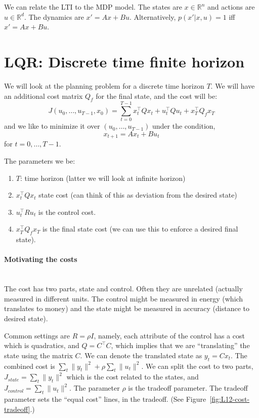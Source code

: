 We can relate the LTI to the MDP model. The states are $x\in
\mathbb{R}^n$ and actions are $u\in\mathbb{R}^d$. The dynamics are
$x'=Ax+Bu$. Alternatively, $p(x'|x,u)=1 $ iff $x'=Ax+Bu$.

\section{LQR: Discrete time finite horizon}

We will look at the planning problem for a discrete time horizon
$T$. We will have an additional cost matrix $Q_f$ for the final
state, and the cost will be:
\[
J(u_0, \ldots,u_{T-1},x_0)=\sum_{t=0}^{T-1} x_t^\top Q x_t +u_t^\top
Q u_t + x_T^\top Q_f x_T
\]
and we like to minimize it over $(u_0, \ldots, u_{T-1})$ under the
condition,
\[
x_{t+1}=Ax_t+Bu_t
\]
for $t=0, \ldots, T-1$.

The parameters we be:
\begin{enumerate}
\item
$T$: time horizon (latter we will look at infinite horizon)
\item
$x_t^\top Qx_t$ state cost (can think of this as deviation from the
desired state)
\item
$u_t^\top R u_t$ is the control cost.
\item
$x_T^\top Q_f x_T$ is the final state cost (we can use this to
enforce a desired final state).
\end{enumerate}

\paragraph{Motivating the costs}\ \\

The cost has two parts, state and control. Often they are unrelated
(actually measured in different units. The control might be measured
in energy (which translates to money) and the state might be
measured in accuracy (distance to desired state).

Common settings are $R=\rho I$, namely, each attribute of the
control has a cost which is quadratics, and $Q=C^\top C$, which
implies that we are ``translating'' the state using the matrix $C$.
We can denote the translated state as $y_t =Cx_t$. The combined cost
is $\sum_t \|y_t\|^2+\rho\sum_t \|u_t\|^2$. We can split the cost to
two parts, $J_{state}=\sum_t \|y_t\|^2$ which is the cost related to
the states, and $J_{control}=\sum_t \|u_t\|^2$. The parameter $\rho$
is the tradeoff parameter. The tradeoff parameter sets the ``equal
cost'' lines, in the tradeoff. (See
Figure~\ref{fig:L12-cost-tradeoff}.)


